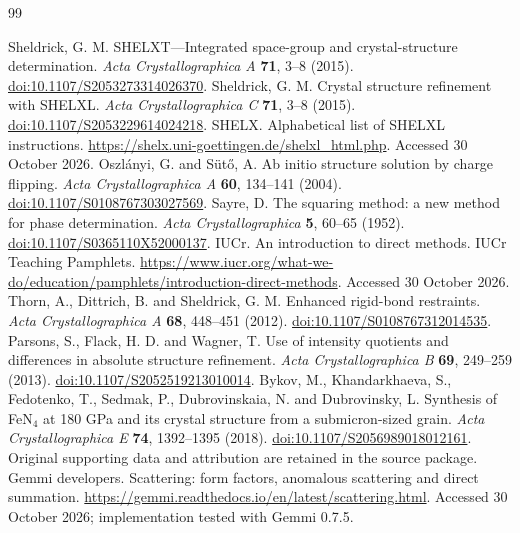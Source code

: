 \begin{thebibliography}{99}
\latinfont
{} Sheldrick, G. M. SHELXT---Integrated space-group and crystal-structure determination. \textit{Acta Crystallographica A} \textbf{71}, 3--8 (2015). \href{https://doi.org/10.1107/S2053273314026370}{doi:10.1107/S2053273314026370}.
 Sheldrick, G. M. Crystal structure refinement with SHELXL. \textit{Acta Crystallographica C} \textbf{71}, 3--8 (2015). \href{https://doi.org/10.1107/S2053229614024218}{doi:10.1107/S2053229614024218}.
 SHELX. Alphabetical list of SHELXL instructions. \url{https://shelx.uni-goettingen.de/shelxl_html.php}. Accessed 30 October 2026.
 Oszl\'anyi, G. and S\"ut\H{o}, A. Ab initio structure solution by charge flipping. \textit{Acta Crystallographica A} \textbf{60}, 134--141 (2004). \href{https://doi.org/10.1107/S0108767303027569}{doi:10.1107/S0108767303027569}.
 Sayre, D. The squaring method: a new method for phase determination. \textit{Acta Crystallographica} \textbf{5}, 60--65 (1952). \href{https://doi.org/10.1107/S0365110X52000137}{doi:10.1107/S0365110X52000137}.
 IUCr. An introduction to direct methods. IUCr Teaching Pamphlets. \url{https://www.iucr.org/what-we-do/education/pamphlets/introduction-direct-methods}. Accessed 30 October 2026.
 Thorn, A., Dittrich, B. and Sheldrick, G. M. Enhanced rigid-bond restraints. \textit{Acta Crystallographica A} \textbf{68}, 448--451 (2012). \href{https://doi.org/10.1107/S0108767312014535}{doi:10.1107/S0108767312014535}.
 Parsons, S., Flack, H. D. and Wagner, T. Use of intensity quotients and differences in absolute structure refinement. \textit{Acta Crystallographica B} \textbf{69}, 249--259 (2013). \href{https://doi.org/10.1107/S2052519213010014}{doi:10.1107/S2052519213010014}.
 Bykov, M., Khandarkhaeva, S., Fedotenko, T., Sedmak, P., Dubrovinskaia, N. and Dubrovinsky, L. Synthesis of FeN$_4$ at 180 GPa and its crystal structure from a submicron-sized grain. \textit{Acta Crystallographica E} \textbf{74}, 1392--1395 (2018). \href{https://doi.org/10.1107/S2056989018012161}{doi:10.1107/S2056989018012161}. Original supporting data and attribution are retained in the source package.
 Gemmi developers. Scattering: form factors, anomalous scattering and direct summation. \url{https://gemmi.readthedocs.io/en/latest/scattering.html}. Accessed 30 October 2026; implementation tested with Gemmi 0.7.5.

\end{thebibliography}
